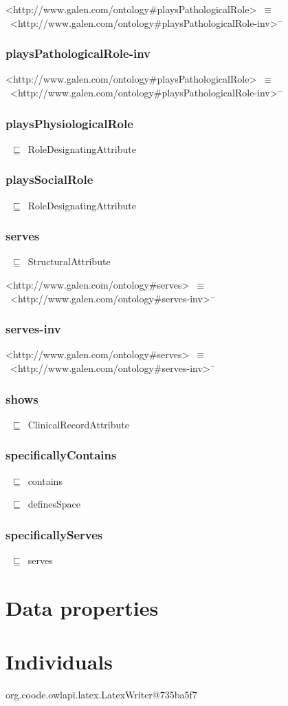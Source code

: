 \documentclass{article}
\begin{document}
<http://www.galen.com/ontology#playsPathologicalRole>~\ensuremath{\equiv}~<http://www.galen.com/ontology#playsPathologicalRole-inv>\ensuremath{^-}

\subsubsection*{playsPathologicalRole-inv}

<http://www.galen.com/ontology#playsPathologicalRole>~\ensuremath{\equiv}~<http://www.galen.com/ontology#playsPathologicalRole-inv>\ensuremath{^-}

\subsubsection*{playsPhysiologicalRole}

~\ensuremath{\sqsubseteq}~RoleDesignatingAttribute

\subsubsection*{playsSocialRole}

~\ensuremath{\sqsubseteq}~RoleDesignatingAttribute

\subsubsection*{serves}

~\ensuremath{\sqsubseteq}~StructuralAttribute

<http://www.galen.com/ontology#serves>~\ensuremath{\equiv}~<http://www.galen.com/ontology#serves-inv>\ensuremath{^-}

\subsubsection*{serves-inv}

<http://www.galen.com/ontology#serves>~\ensuremath{\equiv}~<http://www.galen.com/ontology#serves-inv>\ensuremath{^-}

\subsubsection*{shows}

~\ensuremath{\sqsubseteq}~ClinicalRecordAttribute

\subsubsection*{specificallyContains}

~\ensuremath{\sqsubseteq}~contains

~\ensuremath{\sqsubseteq}~definesSpace

\subsubsection*{specificallyServes}

~\ensuremath{\sqsubseteq}~serves

\section*{Data properties}\section*{Individuals}org.coode.owlapi.latex.LatexWriter@735ba5f7
\end{document}
